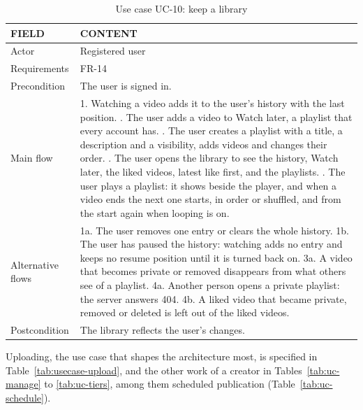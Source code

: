 \begin{table}[H]
\centering
\caption{Use case UC-10: keep a library}
\label{tab:uc-library}
\small
\begin{tabularx}{\textwidth}{p{} X}
\toprule
\textbf{FIELD} & \textbf{CONTENT} \\
\midrule
Actor & Registered user \\
Requirements & FR-14 \\
Precondition & The user is signed in. \\
Main flow &
  1. Watching a video adds it to the user's history with the last position. \newline
  2. The user adds a video to Watch later, a playlist that every account has. \newline
  3. The user creates a playlist with a title, a description and a visibility, adds videos and changes their order. \newline
  4. The user opens the library to see the history, Watch later, the liked videos, latest like first, and the playlists. \newline
  5. The user plays a playlist: it shows beside the player, and when a video ends the next one starts, in order or shuffled, and from the start again when looping is on. \\
Alternative flows &
  1a. The user removes one entry or clears the whole history. \newline
  1b. The user has paused the history: watching adds no entry and keeps no resume position until it is turned back on. \newline
  3a. A video that becomes private or removed disappears from what others see of a playlist. \newline
  4a. Another person opens a private playlist: the server answers 404. \newline
  4b. A liked video that became private, removed or deleted is left out of the liked videos. \\
Postcondition & The library reflects the user's changes. \\
\bottomrule
\end{tabularx}
\end{table}

Uploading, the use case that shapes the architecture most, is specified in
Table~\ref{tab:usecase-upload}, and the other work of a creator in Tables~\ref{tab:uc-manage} to
\ref{tab:uc-tiers}, among them scheduled publication (Table~\ref{tab:uc-schedule}).

